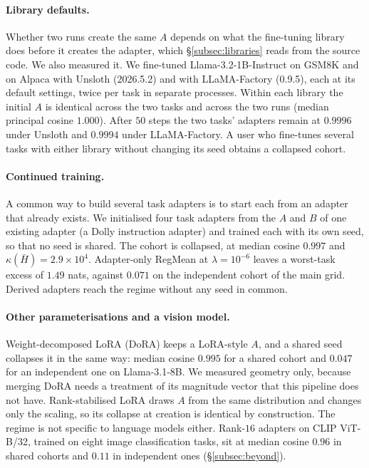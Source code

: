 \paragraph{Library defaults.} Whether two runs create the same $A$ depends on
what the fine-tuning library does before it creates the adapter, which
\S\ref{subsec:libraries} reads from the source code. We also measured it. We
fine-tuned Llama-3.2-1B-Instruct on GSM8K and on Alpaca with Unsloth
(2026.5.2) and with LLaMA-Factory (0.9.5), each at its default settings, twice
per task in separate processes. Within each library the initial $A$ is
identical across the two tasks and across the two runs (median principal
cosine $1.000$). After $50$ steps the two tasks' adapters remain at
$0.9996$ under Unsloth and $0.9994$ under LLaMA-Factory. A
user who fine-tunes several tasks with either library without changing its
seed obtains a collapsed cohort.

\paragraph{Continued training.} A common way to build several task adapters is
to start each from an adapter that already exists. We initialised four task
adapters from the $A$ and $B$ of one existing adapter (a Dolly instruction
adapter) and trained each with its own seed, so that no seed is shared. The
cohort is collapsed, at median cosine $0.997$ and
$\kappa(\bar H) = 2.9\times10^{4}$. Adapter-only RegMean at
$\lambda = 10^{-6}$ leaves a worst-task excess of $1.49$ nats, against
$0.071$ on the independent cohort of the main grid. Derived adapters reach the
regime without any seed in common.

\paragraph{Other parameterisations and a vision model.} Weight-decomposed LoRA
(DoRA) keeps a LoRA-style $A$, and a shared seed collapses it in the same way:
median cosine $0.995$ for a shared cohort and $0.047$ for an independent one on
Llama-3.1-8B. We measured geometry only, because merging DoRA needs a
treatment of its magnitude vector that this pipeline does not have.
Rank-stabilised LoRA draws $A$ from the same distribution and changes only the
scaling, so its collapse at creation is identical by construction. The regime
is not specific to language models either. Rank-$16$ adapters on CLIP
ViT-B/32, trained on eight image classification tasks, sit at median cosine
$0.96$ in shared cohorts and $0.11$ in independent ones
(\S\ref{subsec:beyond}).
